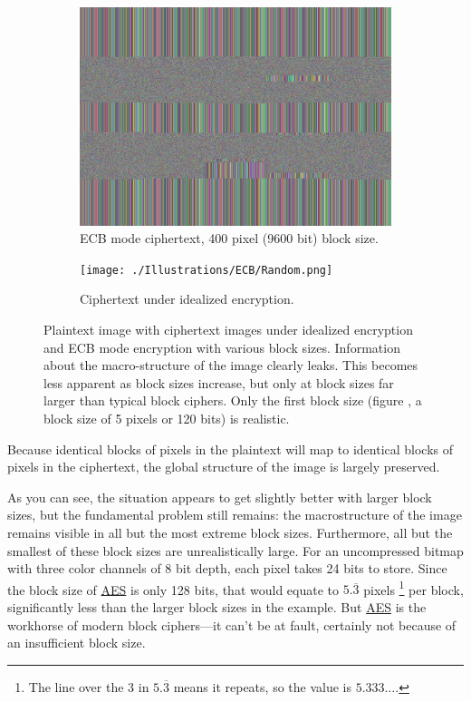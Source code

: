 \documentclass[11pt,ebook,table,dvipsnames]{memoir}
\begin{document}
\begin{figure}[p]
  \begin{subfigure}[b]{.45\textwidth}
    \includegraphics[width=\textwidth]{./Illustrations/ECB/Ciphertext400.png}
    \caption{ECB mode ciphertext, 400 pixel (9600 bit) block size.}
  \end{subfigure}
  \quad
  \begin{subfigure}[b]{.45\textwidth}
    \texttt{[image: ./Illustrations/ECB/Random.png]}
    \caption{Ciphertext under idealized encryption.}
    \label{fig:ECBDemoIdealizedCiphertext}
  \end{subfigure}

  \caption{Plaintext image with ciphertext images under idealized
    encryption and ECB mode encryption with various block sizes.
    Information about the macro-structure of the image clearly leaks.
    This becomes less apparent as block sizes increase, but only at
    block sizes far larger than typical block ciphers. Only the first
    block size (figure , a block size of 5
    pixels or 120 bits) is realistic.}
\end{figure}

Because identical blocks of pixels in the plaintext will map to
identical blocks of pixels in the ciphertext, the global structure of
the image is largely preserved.

As you can see, the situation appears to get slightly better with
larger block sizes, but the fundamental problem still remains: the
macrostructure of the image remains visible in all but the most
extreme block sizes. Furthermore, all but the smallest of these block
sizes are unrealistically large. For an uncompressed bitmap with three
color channels of 8 bit depth, each pixel takes 24 bits to store.
Since the block size of \hyperref[AES]{AES} is only 128 bits, that would equate to
$5.\overline{3}$ pixels \footnote{The line over the $3$ in $5.\overline{3}$
means it repeats, so the value is $5.333\ldots$.} per block,
significantly less than the larger block sizes in the example. But \hyperref[AES]{AES}
is the workhorse of modern block ciphers---it can't be at fault,
certainly not because of an insufficient block size.
\end{document}
